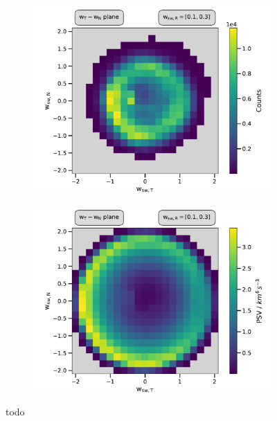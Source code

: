 \begin{figure}
	\centering
	\begin{subfigure}{.5\textwidth}
		\centering
		\includegraphics[width=1\textwidth]{Figures/cart_lang_R_counts.pdf}
	\end{subfigure}%
	\begin{subfigure}{.5\textwidth}
		\centering
		\includegraphics[width=1\textwidth]{Figures/cart_lang_R_norm.pdf}
	\end{subfigure}
	\caption{todo}
	\label{fig:counts_norm_lang}
\end{figure}


